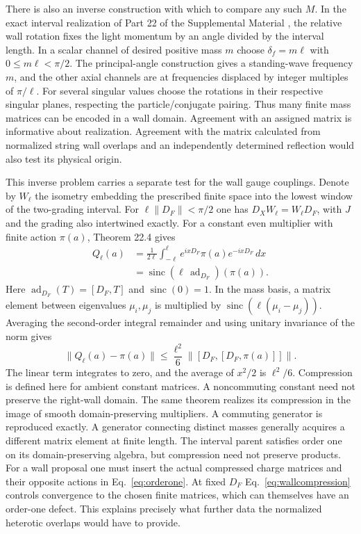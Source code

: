 \documentclass[aps,prd,reprint,onecolumn,nofootinbib,amsmath,amssymb]{revtex4-2}
\begin{document}
There is also an inverse construction with which to compare any such $M$. In the exact interval realization of Part 22 of the Supplemental Material \cite{boundarynote}, the relative wall rotation fixes the light momentum by an angle divided by the interval length. In a scalar channel of desired positive mass $m$ choose $\delta_f=m\ell$ with $0\leq m\ell<\pi/2$. The principal-angle construction gives a standing-wave frequency $m$, and the other axial channels are at frequencies displaced by integer multiples of $\pi/\ell$. For several singular values choose the rotations in their respective singular planes, respecting the particle/conjugate pairing. Thus many finite mass matrices can be encoded in a wall domain. Agreement with an assigned matrix is informative about realization. Agreement with the matrix calculated from normalized string wall overlaps and an independently determined reflection would also test its physical origin.

This inverse problem carries a separate test for the wall gauge couplings. Denote by $W_\ell$ the isometry embedding the prescribed finite space into the lowest window of the two-grading interval. For $\ell\|D_F\|<\pi/2$ one has $D_XW_\ell=W_\ell D_F$, with $J$ and the grading also intertwined exactly. For a constant even multiplier with finite action $\pi(a)$, Theorem 22.4 gives
\begin{equation}
\begin{aligned}
 Q_\ell(a)
 &=\frac1{2\ell}\int_{-\ell}^{\ell}
    e^{ixD_F}\pi(a)e^{-ixD_F}\,dx\\
 &=\operatorname{sinc}(\ell\,\operatorname{ad}_{D_F})(\pi(a)).
\end{aligned}
\end{equation}
Here $\operatorname{ad}_{D_F}(T)=[D_F,T]$ and $\operatorname{sinc}(0)=1$. In the mass basis, a matrix element between eigenvalues $\mu_i,\mu_j$ is multiplied by $\operatorname{sinc}(\ell(\mu_i-\mu_j))$. Averaging the second-order integral remainder and using unitary invariance of the norm gives
\begin{equation}
 \|Q_\ell(a)-\pi(a)\|
 \leq\frac{\ell^2}{6}\|[D_F,[D_F,\pi(a)]]\|.
 \label{eq:wallcompression}
\end{equation}
The linear term integrates to zero, and the average of $x^2/2$ is $\ell^2/6$. Compression is defined here for ambient constant matrices. A noncommuting constant need not preserve the right-wall domain. The same theorem realizes its compression in the image of smooth domain-preserving multipliers. A commuting generator is reproduced exactly. A generator connecting distinct masses generally acquires a different matrix element at finite length. The interval parent satisfies order one on its domain-preserving algebra, but compression need not preserve products. For a wall proposal one must insert the actual compressed charge matrices and their opposite actions in Eq.~\eqref{eq:orderone}. At fixed $D_F$ Eq.~\eqref{eq:wallcompression} controls convergence to the chosen finite matrices, which can themselves have an order-one defect. This explains precisely what further data the normalized heterotic overlaps would have to provide.
\end{document}

